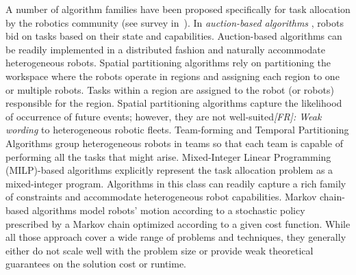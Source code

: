 \documentclass[conference]{IEEEtran}
\newcommand{\frline}[2]{{\color{blue}#1}{\em \color{blue}[FR]: #2}}
\newcommand{\frline}[2]{#1}
\begin{document}
A number of algorithm families have been proposed specifically for 
task allocation by the robotics community (see survey in~\cite{RossiBandyopadhyayEtAl2018}). In \emph{auction-based algorithms} \cite{Mataric04,Ayanian17}, robots bid on tasks based on their state and capabilities. Auction-based algorithms can be readily implemented in a distributed fashion and naturally accommodate heterogeneous robots. Spatial partitioning algorithms \cite{PavoneFrazzoliEtAl2011} rely on partitioning the workspace where the robots operate in regions and assigning each region to one or multiple robots. Tasks within a region are assigned to the robot (or robots) responsible for the region. Spatial partitioning algorithms capture the likelihood of occurrence of future events; however, they are \frline{not well-suited}{Weak wording} to heterogeneous robotic fleets. Team-forming and Temporal Partitioning Algorithms \cite{Smith09} group heterogeneous robots in teams so that each team is capable of performing all the tasks that might arise. %
Mixed-Integer Linear Programming (MILP)-based algorithms \cite{Bellingham03} explicitly represent the task allocation problem as a mixed-integer program. Algorithms in this class can readily capture a rich family of constraints and accommodate heterogeneous robot capabilities.%
Markov chain-based algorithms \cite{Bandyopadhyay17} model robots' motion according to a stochastic policy prescribed by a Markov chain optimized according to a given cost function. %
While all those approach cover a wide range of problems and techniques, they generally either do not scale well with the problem size or provide weak theoretical guarantees on the solution cost or runtime.
\end{document}
